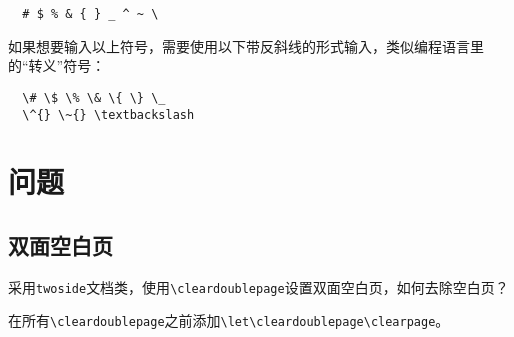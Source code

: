 \begin{lstlisting}
  # $ % & { } _ ^ ~ \
\end{lstlisting}

如果想要输入以上符号，需要使用以下带反斜线的形式输入，类似编程语言里的“转义”符号：
\begin{lstlisting}
  \# \$ \% \& \{ \} \_
  \^{} \~{} \textbackslash
\end{lstlisting}

\section{问题}\label{sec:qa}
\subsection{双面空白页}\label{subsec:blankpage}
采用\lstinline{twoside}文档类，使用\lstinline{\cleardoublepage}设置双面空白页，如何去除空白页？

在所有\lstinline{\cleardoublepage}之前添加\lstinline{\let\cleardoublepage\clearpage}。